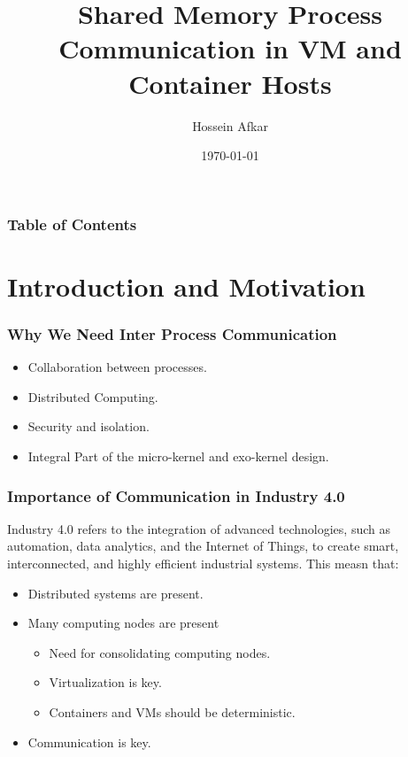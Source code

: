 \documentclass{beamer}
\title[VM and Container Communications]{Shared Memory Process Communication in VM and Container Hosts}
\author[Afkar]{Hossein Afkar}
\institute{University of Tehran}
\date{\today}
\begin{document}
\frame{\titlepage}

\begin{frame}
    \frametitle{Table of Contents}
    \tableofcontents[hideallsubsections]
\end{frame}


\section{Introduction and Motivation}

\begin{frame}
    \frametitle{Why We Need Inter Process Communication}
    \begin{itemize}
        \item Collaboration between processes.
        \item Distributed Computing.
        \item Security and isolation.
        \item Integral Part of the micro-kernel and exo-kernel design.
    \end{itemize}
\end{frame}

\begin{frame}
    \frametitle{Importance of Communication in Industry 4.0}
    Industry 4.0 refers to the integration of advanced technologies,
    such as automation, data analytics, and the Internet of Things,
    to create smart, interconnected, and highly efficient industrial
    systems. This measn that:
    \begin{itemize}
        \item Distributed systems are present.
        \item Many computing nodes are present
            \begin{itemize}
                \item Need for consolidating computing nodes.
                \item Virtualization is key.
                \item Containers and VMs should be deterministic.
            \end{itemize}
        \item Communication is key.
    \end{itemize}
\end{frame}
\end{document}
